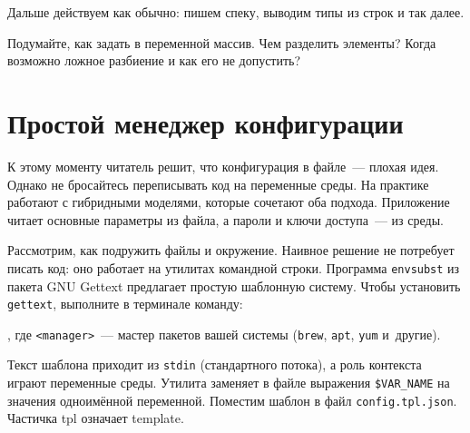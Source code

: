 \fi

\noindent
Дальше действуем как обычно: пишем спеку, выводим типы из строк и так далее.

Подумайте, как задать в переменной массив. Чем разделить элементы? Когда
возможно ложное разбиение и как его не допустить?

\section{Простой менеджер конфигурации}


К этому моменту читатель решит, что конфигурация в файле~--- плохая идея. Однако
не бросайтесь переписывать код на переменные среды. На практике работают с
гибридными моделями, которые сочетают оба подхода. Приложение читает
основные параметры из файла, а пароли и ключи доступа~--- из среды.


Рассмотрим, как подружить файлы и окружение. Наивное решение не потребует писать
код: оно работает на утилитах командной строки. Программа \verb|envsubst| из
пакета GNU Gettext предлагает простую шаблонную систему. Чтобы установить
\verb|gettext|, выполните в терминале команду:

\pagebreaklarge

\begin{english}
\end{english}

\noindent
, где \verb|<manager>|~--- мастер пакетов вашей системы (\verb|brew|,
\verb|apt|, \verb|yum| и~другие).


Текст шаблона приходит из \verb|stdin| (стандартного потока), а роль контекста
играют переменные среды. Утилита заменяет в файле выражения \verb|$VAR_NAME| на
значения одноимённой переменной. Поместим шаблон в файл
\verb|config.tpl.json|. Частичка tpl означает template.

\begin{english}
\end{english}

